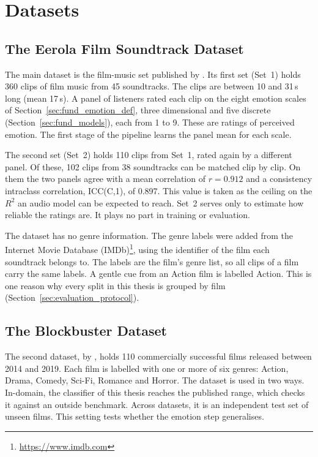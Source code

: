 \section{Datasets}
\label{sec:methods_data}

\subsection{The Eerola Film Soundtrack Dataset}
\label{subsec:methods_eerola}

The main dataset is the film-music set published by \citet{eerola2011comparison}. Its first set (Set~1) holds 360 clips of film music from 45 soundtracks. The clips are between 10 and 31\,s long (mean 17\,s). A panel of listeners rated each clip on the eight emotion scales of Section~\ref{sec:fund_emotion_def}, three dimensional and five discrete (Section~\ref{sec:fund_models}), each from 1 to 9. These are ratings of perceived emotion. The first stage of the pipeline learns the panel mean for each scale.

The second set (Set~2) holds 110 clips from Set~1, rated again by a different panel. Of these, 102 clips from 38 soundtracks can be matched clip by clip. On them the two panels agree with a mean correlation of $r=0.912$ and a consistency intraclass correlation, ICC(C,1), of 0.897. This value is taken as the ceiling on the $R^2$ an audio model can be expected to reach. Set~2 serves only to estimate how reliable the ratings are. It plays no part in training or evaluation.

The dataset has no genre information. The genre labels were added from the Internet Movie Database (IMDb)\footnote{\url{https://www.imdb.com}}, using the identifier of the film each soundtrack belongs to. The labels are the film's genre list, so all clips of a film carry the same labels. A gentle cue from an Action film is labelled Action. This is one reason why every split in this thesis is grouped by film (Section~\ref{sec:evaluation_protocol}).

\subsection{The Blockbuster Dataset}
\label{subsec:methods_blockbuster}

The second dataset, by \citet{ma2021computational}, holds 110 commercially successful films released between 2014 and 2019. Each film is labelled with one or more of six genres: Action, Drama, Comedy, Sci-Fi, Romance and Horror. The dataset is used in two ways. In-domain, the classifier of this thesis reaches the published range, which checks it against an outside benchmark. Across datasets, it is an independent test set of unseen films. This setting tests whether the emotion step generalises.

